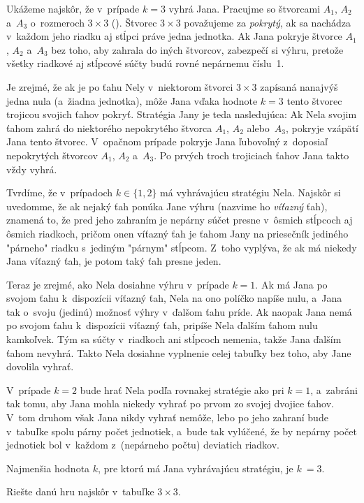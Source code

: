 {%
Ukážeme najskôr, že v~prípade $k=3$ vyhrá Jana. Pracujme so štvorcami $A_1$,
$A_2$ a~$A_3$ o~rozmeroch $3 \times 3$ (\obr). Štvorec $3 \times 3$
považujeme za {\it pokrytý}, ak sa nachádza v~každom jeho riadku
aj stĺpci práve jedna jednotka. Ak Jana pokryje štvorce $A_1$, $A_2$
a~$A_3$ bez toho, aby zahrala do iných štvorcov, zabezpečí si výhru, pretože všetky riadkové
aj stĺpcové súčty budú rovné nepárnemu číslu~1.
%

Je zrejmé, že ak je po ťahu Nely v~niektorom štvorci $3 \times 3$ zapísaná nanajvýš jedna
nula (a~žiadna jednotka), môže Jana vďaka hodnote $k=3$ tento štvorec trojicou svojich
ťahov pokryť. Stratégia Jany je teda nasledujúca: Ak Nela svojim ťahom zahrá do
niektorého nepokrytého štvorca $A_1$, $A_2$ alebo~$A_3$, pokryje vzápätí Jana
tento štvorec. V~opačnom prípade pokryje Jana ľubovoľný z~doposiaľ nepokrytých štvorcov
$A_1$, $A_2$ a~$A_3$. Po prvých troch trojiciach ťahov Jana takto vždy vyhrá.

Tvrdíme, že v~prípadoch $k\in\{1, 2\}$ má vyhrávajúcu stratégiu Nela.
Najskôr si uvedomme, že
ak nejaký ťah ponúka Jane výhru (nazvime ho {\it víťazný\/} ťah), znamená
to, že pred jeho zahraním je nepárny súčet presne v~ôsmich stĺpcoch
aj ôsmich riadkoch, pričom onen víťazný ťah je ťahom Jany na priesečník jediného
"párneho" riadku s~jediným "párnym" stĺpcom. Z~toho vyplýva, že
ak má niekedy Jana víťazný ťah, je potom taký ťah presne jeden.

Teraz je zrejmé, ako Nela dosiahne výhru v~prípade $k=1$. Ak má Jana po svojom ťahu
k~dispozícii víťazný ťah, Nela na ono políčko napíše nulu, a~Jana tak o~svoju
(jedinú) možnosť výhry v~ďalšom ťahu príde. Ak naopak Jana nemá po svojom ťahu
k~dispozícii víťazný ťah, pripíše Nela ďalším ťahom nulu kamkoľvek. Tým sa
súčty v~riadkoch ani stĺpcoch nemenia, takže Jana ďalším ťahom nevyhrá.
Takto Nela dosiahne vyplnenie celej tabuľky bez toho, aby Jane dovolila vyhrať.

V~prípade $k=2$ bude hrať Nela podľa rovnakej stratégie ako pri $k=1$,
a~zabráni tak tomu, aby Jana mohla niekedy vyhrať po prvom zo svojej dvojice ťahov.
V~tom druhom však
Jana nikdy vyhrať nemôže, lebo po jeho zahraní bude v~tabuľke spolu párny
počet jednotiek, a~bude tak vylúčené, že by nepárny počet jednotiek bol v~každom
z~(nepárneho počtu) deviatich riadkov.

\odpoved
Najmenšia hodnota $k$, pre ktorú má Jana vyhrávajúcu stratégiu, je $k~= 3$.


Riešte danú hru najskôr v~tabuľke $3 \times 3$.

}
